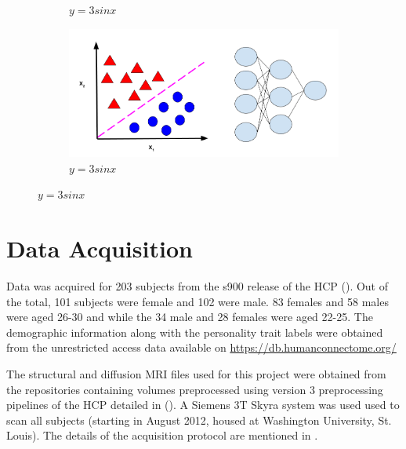 \documentclass[msthesis.tex]{subfiles}
\begin{document}
\begin{figure}
\begin{subfigure}[b]{0.4\textwidth}
         \caption{$y=3sinx$}
         \label{fig:three sin x}
         \end{subfigure}
    \vfill
            \begin{subfigure}[b]{\textwidth}
         \centering
         \includegraphics[height =0.5\textwidth,width=\textwidth]{images/classification.png}
         \caption{$y=3sinx$}
         \label{fig:three sin x}
         \end{subfigure}


\end{figure}
\section{Data Acquisition}
\label{sec:acquisition}
Data was acquired for 203 subjects from the s900 release of the HCP (\cite{hcp2015wu}). Out of the total, 101 subjects were female and 102 were male. 83 females and 58 males were aged 26-30 and while the 34 male and 28 females were aged 22-25. The demographic information along with the personality trait labels were obtained from the unrestricted access data available on \href{https://db.humanconnectome.org/}{https://db.humanconnectome.org/}


The structural and diffusion MRI files used for this project were obtained from the repositories containing volumes preprocessed using version 3 preprocessing pipelines of the HCP detailed in (\cite{GLASSER2013105}). A Siemens 3T Skyra system was used used to scan all subjects (starting in August 2012, housed at Washington University, St. Louis). The details of the acquisition protocol are mentioned in \cite{van2012human}.
\end{document}
